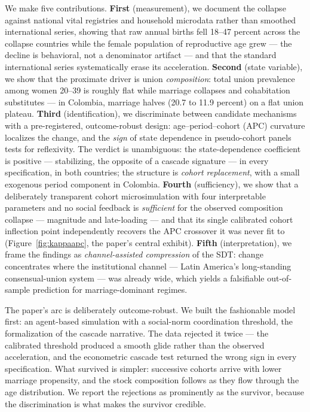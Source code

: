 We make five contributions. \textbf{First} (measurement), we document the
collapse against national vital registries and household microdata rather than
smoothed international series, showing that raw annual births fell 18--47 percent
across the collapse countries while the female population of reproductive age
grew --- the decline is behavioral, not a denominator artifact --- and that the
standard international series systematically erase its acceleration.
\textbf{Second} (state variable), we show that the proximate driver is union
\emph{composition}: total union prevalence among women 20--39 is roughly flat
while marriage collapses and cohabitation substitutes --- in Colombia, marriage
halves (20.7 to 11.9 percent) on a flat union plateau. \textbf{Third}
(identification), we discriminate between candidate mechanisms with a
pre-registered, outcome-robust design: age--period--cohort (APC) curvature
localizes the change, and the \emph{sign} of state dependence in pseudo-cohort
panels tests for reflexivity. The verdict is unambiguous: the state-dependence
coefficient is positive --- stabilizing, the opposite of a cascade signature ---
in every specification, in both countries; the structure is \emph{cohort
replacement}, with a small exogenous period component in Colombia.
\textbf{Fourth} (sufficiency), we show that a deliberately transparent cohort
microsimulation with four interpretable parameters and no social feedback is
\emph{sufficient} for the observed composition collapse --- magnitude and
late-loading --- and that its single calibrated cohort inflection point
independently recovers the APC crossover it was never fit to
(Figure~\ref{fig:kappaapc}, the paper's central exhibit). \textbf{Fifth}
(interpretation), we frame the findings as \emph{channel-assisted compression}
of the SDT: change concentrates where the institutional channel --- Latin
America's long-standing consensual-union system \citep{esteve2012} --- was
already wide, which yields a falsifiable out-of-sample prediction for
marriage-dominant regimes.

The paper's arc is deliberately outcome-robust. We built the fashionable model
first: an agent-based simulation with a social-norm coordination threshold, the
formalization of the cascade narrative. The data rejected it twice --- the
calibrated threshold produced a smooth glide rather than the observed
acceleration, and the econometric cascade test returned the wrong sign in every
specification. What survived is simpler: successive cohorts arrive with lower
marriage propensity, and the stock composition follows as they flow through the
age distribution. We report the rejections as prominently as the survivor,
because the discrimination is what makes the survivor credible.

